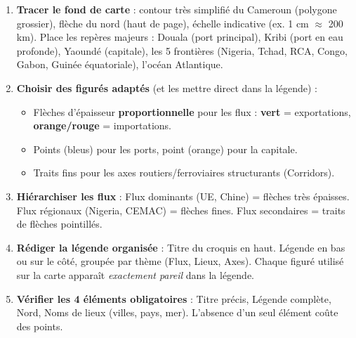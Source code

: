 \documentclass[11pt]{article}
\begin{document}
\begin{methode}
\begin{enumerate}
\item \textbf{Tracer le fond de carte} : contour très simplifié du Cameroun (polygone grossier), flèche du nord (haut de page), échelle indicative (ex. 1 cm $\approx$ 200 km). Place les repères majeurs : Douala (port principal), Kribi (port en eau profonde), Yaoundé (capitale), les 5 frontières (Nigeria, Tchad, RCA, Congo, Gabon, Guinée équatoriale), l'océan Atlantique.
\item \textbf{Choisir des figurés adaptés} (et les mettre direct dans la légende) :
    \begin{itemize}
    \item Flèches d'épaisseur \textbf{proportionnelle} pour les flux : \textbf{vert} = exportations, \textbf{orange/rouge} = importations.
    \item Points (bleus) pour les ports, point (orange) pour la capitale.
    \item Traits fins pour les axes routiers/ferroviaires structurants (Corridors).
    \end{itemize}
\item \textbf{Hiérarchiser les flux} : Flux dominants (UE, Chine) = flèches très épaisses. Flux régionaux (Nigeria, CEMAC) = flèches fines. Flux secondaires = traits de flèches pointillés.
\item \textbf{Rédiger la légende organisée} : Titre du croquis en haut. Légende en bas ou sur le côté, groupée par thème (Flux, Lieux, Axes). Chaque figuré utilisé sur la carte apparaît \emph{exactement pareil} dans la légende.
\item \textbf{Vérifier les 4 éléments obligatoires} : Titre précis, Légende complète, Nord, Noms de lieux (villes, pays, mer). L'absence d'un seul élément coûte des points.
\end{enumerate}
\end{methode}
\end{document}
